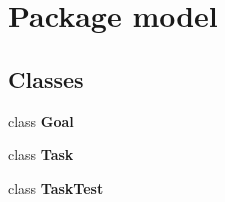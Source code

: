 \section{Package model}
\label{namespacemodel}
\subsection*{Classes}
\begin{DoxyCompactItemize}
\item 
class \textbf{ Goal}
\item 
class \textbf{ Task}
\item 
class \textbf{ Task\+Test}
\end{DoxyCompactItemize}

